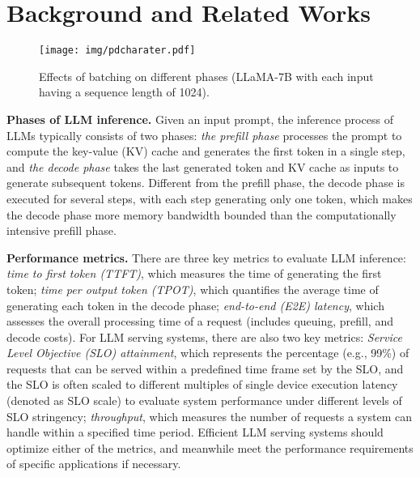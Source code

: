 \section{Background and Related Works}
\label{sec:2}

\begin{figure}[!t] 
  \centering
  \texttt{[image: img/pdcharater.pdf]} %
  \vspace{-1em}
  \caption{\small{Effects of batching on different phases (LLaMA-7B with each input having a sequence length of 1024).}}
  \label{fig:prefillvsdecode}
  \vspace{-1em}
\end{figure}

\noindent \textbf{Phases of LLM inference.}
Given an input prompt, the inference process of LLMs typically consists of two phases: \textit{the prefill phase} processes the prompt to compute the key-value (KV) cache and generates the first token in a single step, and \textit{the decode phase} takes the last generated token and KV cache as inputs to generate subsequent tokens. Different from the prefill phase, the decode phase is executed for several steps, with each step generating only one token, which makes the decode phase more memory bandwidth bounded than the computationally intensive prefill phase. 



\noindent \textbf{Performance metrics.}
There are three key metrics to evaluate LLM inference: \textit{time to first token (TTFT)}, which measures the time of generating the first token; \textit{time per output token (TPOT)}, which quantifies the average time of generating each token in the decode phase; \textit{end-to-end (E2E) latency}, which assesses the overall processing time of a request (includes queuing, prefill, and decode costs).
For LLM serving systems, there are also two key metrics: \textit{Service Level Objective (SLO) attainment}, which represents the percentage (e.g., 99\%) of requests that can be served within a predefined time frame set by the SLO, and the SLO is often scaled to different multiples of single device execution latency (denoted as SLO scale) to evaluate system performance under different levels of SLO stringency; \textit{throughput}, which measures the number of requests a system can handle within a specified time period. Efficient LLM serving systems should optimize either of the metrics, and meanwhile meet the performance requirements of specific applications if necessary.








